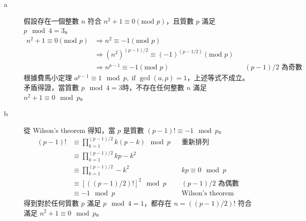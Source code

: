 \documentclass[11pt]{article}
\begin{document}
\begin{description}
	\item[a] 假設存在一個整數 $n$ 符合 $n^2 + 1 \equiv 0 (\text{mod } p)$，且質數 
		$p$ 滿足 $p \mod 4 = 3$。
		\begin{align*}
			n^2 + 1 \equiv 0 (\text{mod } p) 
			&\Rightarrow n^2 \equiv -1 (\text{mod } p) \\
			&\Rightarrow (n^2)^{(p-1)/2} \equiv (-1)^{(p-1/2)} (\text{mod } p) \\
			&\Rightarrow n^{p-1} \equiv -1 (\text{mod } p) && (p-1)/2 \text{ 為奇數}
		\end{align*}
		根據費馬小定理 $a^{p-1} \equiv 1 \mod p, \; \text{if } \gcd(a, p) = 1$，上述等式不成立。
		矛盾得證，當質數 $p \mod 4 = 3$時，不存在任何整數 $n$ 滿足 $n^2+1 \equiv 0 \mod p$。
	\item[b] 從 Wilson's theorem 得知，當 $p$ 是質數 $(p-1)! \equiv -1 \mod p$。
		\begin{align*}
			(p-1)! 	&\equiv \prod_{k=1}^{(p-1)/2} k(p-k) \mod p && \text{重新排列} \\
					&\equiv \prod_{k=1}^{(p-1)/2} kp - k^2 & \\
					&\equiv \prod_{k=1}^{(p-1)/2} - k^2 && kp \equiv 0 \mod p\\
					&\equiv [ ((p-1)/2)! ]^2 \mod p && (p-1)/2 \text{ 為偶數} \\
					&\equiv -1 \mod p && \text{Wilson's theorem}
		\end{align*}
		得到對於任何質數 $p$ 滿足 $p \mod 4 = 1$，都存在 $n = ((p-1)/2)!$ 符合
		滿足 $n^2+1 \equiv 0 \mod p$。
\end{description}
\end{document}
